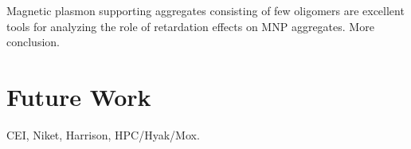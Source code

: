 \documentclass[journal=apchd5,manuscript=article]{achemso}
\begin{document}
Magnetic plasmon supporting aggregates consisting of few oligomers are excellent tools for analyzing the role of retardation effects on MNP aggregates. More conclusion.

\section{Future Work}

\begin{acknowledgement}
CEI, Niket, Harrison, HPC/Hyak/Mox.
\end{acknowledgement}


\end{document}
